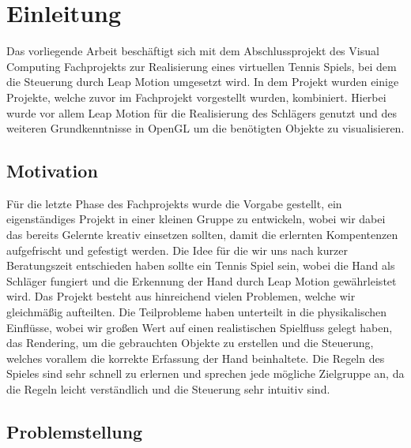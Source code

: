 
\chapter{Einleitung}
\label{Einleitung}
Das vorliegende Arbeit beschäftigt sich mit dem Abschlussprojekt des Visual Computing Fachprojekts zur Realisierung eines virtuellen Tennis Spiels, bei dem 
die Steuerung durch Leap Motion umgesetzt wird.
In dem Projekt wurden einige Projekte, welche zuvor im Fachprojekt vorgestellt wurden, kombiniert. Hierbei wurde vor allem Leap Motion für die Realisierung des Schlägers genutzt und des weiteren
Grundkenntnisse in OpenGL um die benötigten Objekte zu visualisieren.




\section{Motivation}
\label{Motivation_und_Hintergrund}
% 
Für die letzte Phase des Fachprojekts wurde die Vorgabe gestellt, ein eigenständiges Projekt in einer kleinen Gruppe zu entwickeln, wobei wir dabei
das bereits Gelernte kreativ einsetzen sollten, damit die erlernten Kompentenzen aufgefrischt und gefestigt werden.
Die Idee für die wir uns nach kurzer Beratungszeit entschieden haben sollte ein Tennis Spiel sein, wobei die Hand als Schläger fungiert und die Erkennung der Hand
durch Leap Motion gewährleistet wird. 
Das Projekt besteht aus hinreichend vielen Problemen, welche wir gleichmäßig aufteilten. Die Teilprobleme haben unterteilt in die physikalischen Einflüsse, wobei
wir großen Wert auf einen realistischen Spielfluss gelegt haben, das Rendering, um die gebrauchten Objekte zu erstellen und die Steuerung, welches vorallem die korrekte Erfassung der Hand
beinhaltete. 
Die Regeln des Spieles sind sehr schnell zu erlernen und sprechen jede mögliche Zielgruppe an, da die Regeln leicht verständlich und die Steuerung sehr intuitiv sind. %




\newpage
\section{Problemstellung}
\label{Aufbau_der_Arbeit}
%


